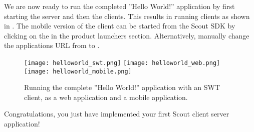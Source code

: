 %


We are now ready to run the completed ''Hello World!'' application by first starting the server and then the clients. 
This results in running clients as shown in . 
The mobile version of the client can be started from the Scout SDK by clicking on the  in the product launchers section. 
Alternatively, manually change the applications URL from  to . 

\begin{figure}
\texttt{[image: helloworld\_swt.png]} \hspace{3mm}
\texttt{[image: helloworld\_web.png]} \hspace{3mm}
\texttt{[image: helloworld\_mobile.png]}
\caption{Running the complete ''Hello World!'' application with an SWT client, as a web application and a mobile application.}
\end{figure}

Congratulations, you just have implemented your first Scout client server application!

